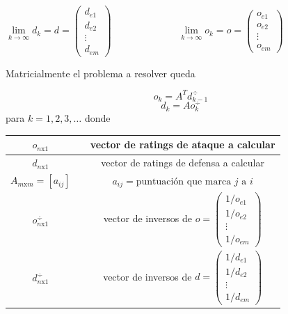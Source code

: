 \begin{center}
	$
\lim\limits_{k \rightarrow \infty} d_{k} = d = \left(\begin{array}{c}
d_{e1}\\
d_{e2}\\
\vdots \\
d_{em}
\end{array} \right)$      
\ \ \ \ \ \ \ \ \ \ \ \ \
$
\lim\limits_{k \rightarrow \infty} o_{k} = o = \left(\begin{array}{c}
o_{e1}\\
o_{e2}\\
\vdots \\
o_{em}
\end{array} \right)$
\end{center}
 

Matricialmente el problema a resolver queda

\begin{equation}
o_{k} = A^{T} d_{k-1}^{\div} \label{ataq}
\end{equation}
\begin{equation}
d_{k} = A o_{k}^{\div} \label{defen}
\end{equation}
para $k=1,2,3,\dots$ donde
\begin{center}
	\begin{tabular}{ccc}
		\hline  $o_{n\text{x}1}$ & & vector de ratings de ataque a calcular \\
		\hline  $d_{n\text{x}1}$ & & vector de ratings de defensa a calcular \\
		\hline $A_{m\text{x}m}=[a_{ij}]$ & & $a_{ij}=\text{puntuación que marca } j \text{ a } i$  \\ 
		\hline  $o_{n\text{x}1}^{\div}$ & & vector de inversos de $o = 		\left(\begin{array}{c}
		1/o_{e1}\\
		1/o_{e2}\\
		\vdots \\
		1/o_{em}
		\end{array} \right)$ \\
		\hline  $d_{n\text{x}1}^{\div}$ & & vector de inversos de $d = 		\left(\begin{array}{c}
		1/d_{e1}\\
		1/d_{e2}\\
		\vdots \\
		1/d_{em}
		\end{array} \right)$ \\
		\hline 
	\end{tabular}
\end{center} 

